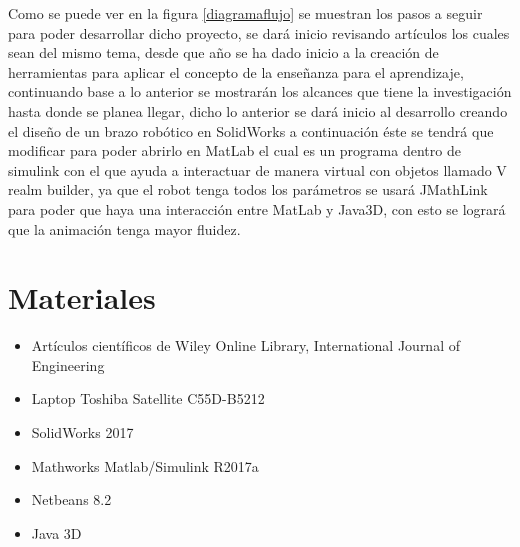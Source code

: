 \newpage
Como se puede ver en la figura \ref{diagramaflujo} se muestran los pasos a seguir para poder desarrollar dicho proyecto, se dará inicio revisando artículos los cuales sean del mismo tema, desde que año se ha dado inicio a la creación de herramientas para aplicar el concepto de la enseñanza para el aprendizaje, continuando base a lo anterior se mostrarán los alcances que tiene la investigación hasta donde se planea llegar, dicho lo anterior se dará inicio al desarrollo creando el diseño de un brazo robótico en SolidWorks a continuación éste se tendrá que modificar para poder abrirlo en MatLab el cual es un programa dentro de simulink con el que ayuda a interactuar de manera virtual con objetos llamado V realm builder, ya que el robot tenga todos los parámetros se usará JMathLink para poder que haya una interacción entre MatLab y Java3D, con esto se logrará que la animación tenga mayor fluidez.

\section{Materiales}
\begin{itemize}
\item Artículos científicos de Wiley Online Library, International Journal of Engineering
\item Laptop Toshiba Satellite C55D-B5212
\item SolidWorks 2017
\item Mathworks Matlab/Simulink R2017a
\item Netbeans 8.2
\item Java 3D
\end{itemize}
